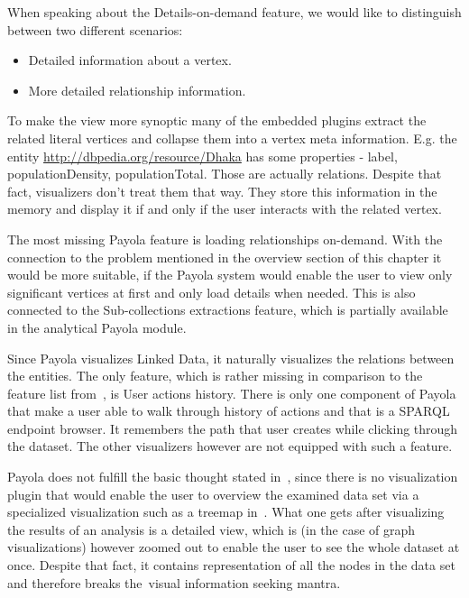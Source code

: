 When speaking about the Details-on-demand feature, we would like to distinguish
between two different
scenarios:

\begin{itemize}
\item Detailed information about a vertex.
\item More detailed relationship information.
\end{itemize}

To make the view more synoptic many of the embedded plugins extract the related literal
vertices and collapse them into a vertex meta information. E.g. the entity
\url{http://dbpedia.org/resource/Dhaka} has some properties - label, populationDensity,
populationTotal. Those are actually relations. Despite that fact, visualizers don’t treat them
that way. They store this information in the memory and display it if and only if the user
interacts with the related vertex.

The most missing Payola feature is loading relationships on-demand. With the connection to the
problem
mentioned in the overview section of this chapter it would be more suitable, if the Payola system
would enable the user to view only significant vertices at first and only load details when needed.
This is also connected to the Sub-collections extractions feature, which is partially available
in the analytical Payola module.

Since Payola visualizes Linked Data, it naturally visualizes the relations between the entities.
The only feature, which is rather missing in comparison to the feature list from~\cite{mantra}, is
User actions history.
There is only one component of Payola that make a user able to walk through 
history of actions and that is a SPARQL endpoint browser. It remembers the path 
that user creates while clicking through the dataset. The other visualizers 
however are not equipped with such a feature.

Payola does not fulfill the basic thought stated in~\cite{mantra}, since 
there is no visualization plugin that would enable the user to overview the 
examined data set via a specialized visualization such as a treemap 
in~\cite{lodvis}. What one gets after visualizing the results of an analysis is a 
detailed view, which is (in the case of graph visualizations) however zoomed out
to enable the user to see the whole dataset at once. Despite that fact, it 
contains representation of all the nodes in the data set and therefore breaks 
the~visual information seeking mantra.
